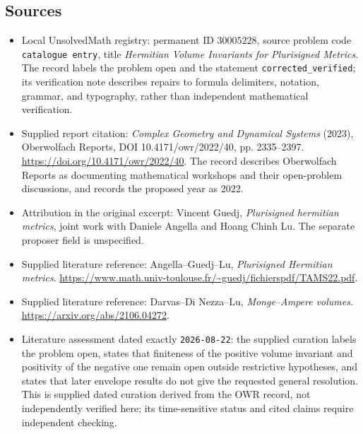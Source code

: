 \documentclass[11pt]{article}
\begin{document}
\subsection{Sources}
\begin{itemize}
\item Local UnsolvedMath registry: permanent ID \(30005228\), source problem code \texttt{catalogue entry}, title \emph{Hermitian Volume Invariants for Plurisigned Metrics}. The record labels the problem open and the statement \texttt{corrected\_verified}; its verification note describes repairs to formula delimiters, notation, grammar, and typography, rather than independent mathematical verification.
\item Supplied report citation: \emph{Complex Geometry and Dynamical Systems} (2023), Oberwolfach Reports, DOI 10.4171/owr/2022/40, pp. 2335--2397. \url{https://doi.org/10.4171/owr/2022/40}. The record describes Oberwolfach Reports as documenting mathematical workshops and their open-problem discussions, and records the proposed year as 2022.
\item Attribution in the original excerpt: Vincent Guedj, \emph{Plurisigned hermitian metrics}, joint work with Daniele Angella and Hoang Chinh Lu. The separate proposer field is unspecified.
\item Supplied literature reference: Angella--Guedj--Lu, \emph{Plurisigned Hermitian metrics}. \url{https://www.math.univ-toulouse.fr/~guedj/fichierspdf/TAMS22.pdf}.
\item Supplied literature reference: Darvas--Di Nezza--Lu, \emph{Monge--Ampere volumes}. \url{https://arxiv.org/abs/2106.04272}.
\item Literature assessment dated exactly \texttt{2026-08-22}: the supplied curation labels the problem open, states that finiteness of the positive volume invariant and positivity of the negative one remain open outside restrictive hypotheses, and states that later envelope results do not give the requested general resolution. This is supplied dated curation derived from the OWR record, not independently verified here; its time-sensitive status and cited claims require independent checking.
\end{itemize}
\end{document}
